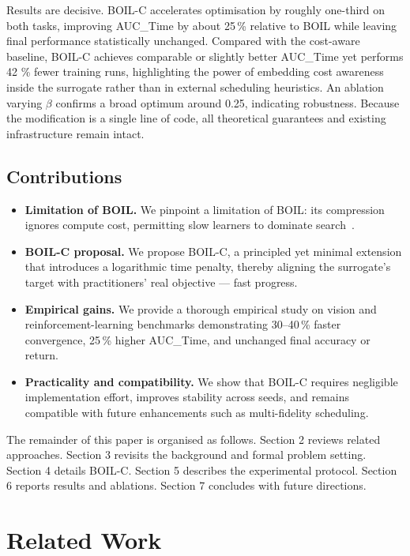 \documentclass{article} %
\begin{document}
Results are decisive. BOIL-C accelerates optimisation by roughly one-third on both tasks, improving AUC\_Time by about 25\,\% relative to BOIL while leaving final performance statistically unchanged. Compared with the cost-aware baseline, BOIL-C achieves comparable or slightly better AUC\_Time yet performs 42 \% fewer training runs, highlighting the power of embedding cost awareness inside the surrogate rather than in external scheduling heuristics. An ablation varying \(\beta\) confirms a broad optimum around 0.25, indicating robustness. Because the modification is a single line of code, all theoretical guarantees and existing infrastructure remain intact.

\subsection{Contributions}
\begin{itemize}
  \item \textbf{Limitation of BOIL\@.} We pinpoint a limitation of BOIL\@: its compression ignores compute cost, permitting slow learners to dominate search~\cite{nguyen-2019-bayesian}.
  \item \textbf{BOIL-C proposal.} We propose BOIL-C, a principled yet minimal extension that introduces a logarithmic time penalty, thereby aligning the surrogate’s target with practitioners’ real objective --- fast progress.
  \item \textbf{Empirical gains.} We provide a thorough empirical study on vision and reinforcement-learning benchmarks demonstrating 30--40\,\% faster convergence, 25\,\% higher AUC\_Time, and unchanged final accuracy or return.
  \item \textbf{Practicality and compatibility.} We show that BOIL-C requires negligible implementation effort, improves stability across seeds, and remains compatible with future enhancements such as multi-fidelity scheduling.
\end{itemize}

The remainder of this paper is organised as follows. Section 2 reviews related approaches. Section 3 revisits the background and formal problem setting. Section 4 details BOIL-C. Section 5 describes the experimental protocol. Section 6 reports results and ablations. Section 7 concludes with future directions.

\section{Related Work}\label{sec:related}
\end{document}
